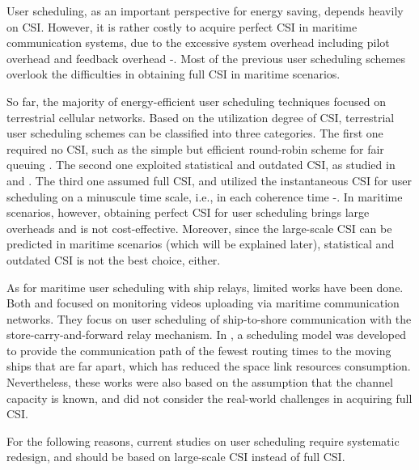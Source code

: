 \documentclass[conference]{IEEEtran}
\begin{document}
 User scheduling, as an important perspective for energy saving, depends heavily on CSI. However, it is rather costly to acquire perfect CSI in maritime communication systems, due to the excessive system overhead including pilot overhead and feedback overhead \cite{p403}-\cite{p405}. Most of the previous user scheduling schemes overlook the difficulties in obtaining full CSI in maritime scenarios. 
 
 So far, the majority of energy-efficient user scheduling techniques focused on terrestrial cellular networks. 
 Based on the utilization degree of CSI, terrestrial user scheduling schemes can be classified into three categories. The first one required no CSI, such as the simple but efficient round-robin scheme for fair queuing \cite{p51}. The second one exploited statistical and outdated CSI, as studied in \cite{p52} and \cite{p53}. The third one assumed full CSI, and utilized the instantaneous CSI for user scheduling on a minuscule time scale, i.e., in each coherence time \cite{p4}-\cite{p7}. 
 In maritime scenarios, however, obtaining perfect CSI for user scheduling brings large overheads and is not cost-effective.
 Moreover, since the large-scale CSI can be predicted in maritime scenarios (which will be explained later), statistical and outdated CSI is not the best choice, either. 

 As for maritime user scheduling with ship relays, limited works have been done. %
 Both \cite{p300} and \cite{p301} focused on monitoring videos uploading via maritime communication networks. They focus on user scheduling of ship-to-shore communication with the store-carry-and-forward relay mechanism.  
 In \cite{p303}, a scheduling model was developed to provide the communication path of the fewest routing times to the moving ships that are far apart, which has reduced the space link resources consumption. 
 Nevertheless, these works were also based on the assumption that the channel capacity is known, and did not consider the real-world challenges in acquiring full CSI. 
  
 
 
 For the following reasons, current studies on user scheduling require systematic redesign, and should be based on large-scale CSI instead of full CSI. 
 
\end{document}
